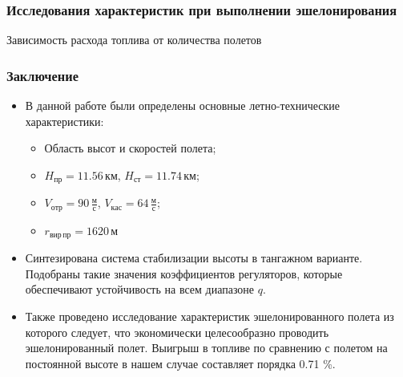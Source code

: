 \documentclass{beamer}
\begin{document}
\begin{frame}[t]
    \frametitle{Исследования характеристик при выполнении эшелонирования}
    \begin{center}
        Зависимость расхода топлива от количества полетов 
        \resizebox{0.65\textwidth}{!}{}
    \end{center}
\end{frame}

\begin{frame}[t]
    \frametitle{Заключение}
    \begin{itemize}
        \item В данной работе были определены основные летно-технические характеристики:
            \begin{itemize}
                \item Область высот и скоростей полета;
                \item $H_{пр}=11.56 \,км$, $H_{ст} = 11.74 \,км$;
                \item $V_{отр}=90 \,\frac{м}{с}$, $V_{кас}=64 \,\frac{м}{с}$;
                \item $r_{вир \,пр}= 1620 \, м$
            \end{itemize}
        \item Синтезирована система стабилизации высоты в тангажном варианте.
            Подобраны такие значения коэффициентов регуляторов, которые обеспечивают
            устойчивость на всем диапазоне $q$.
        \item Также проведено исследование характеристик эшелонированного полета
            из которого следует, что экономически целесообразно проводить
            эшелонированный полет. Выигрыш в топливе по сравнению с полетом на
            постоянной высоте в нашем случае составляет порядка 0.71 \%. 
    \end{itemize}
\end{frame}
\end{document}
